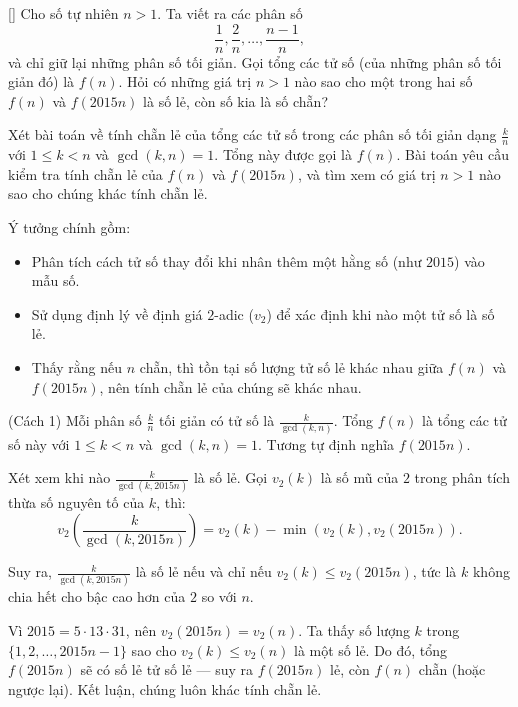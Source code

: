 \documentclass[../06-largest-exponent.tex]{subfiles}
\begin{document}
\begin{example*}\label{example:RUS-2015-MO-11-P2}[\textbf{}]
	Cho số tự nhiên \(n > 1\). Ta viết ra các phân số
	\[
		\frac{1}{n}, \frac{2}{n}, \dots, \frac{n-1}{n},
	\]
	và chỉ giữ lại những phân số tối giản. Gọi tổng các tử số (của những phân số tối giản đó) là \(f(n)\).
	Hỏi có những giá trị \(n > 1\) nào sao cho một trong hai số \(f(n)\) và \(f(2015n)\) là số lẻ, còn số kia là số chẵn?
\end{example*}

\begin{story*}
    Xét bài toán về tính chẵn lẻ của tổng các tử số trong các phân số tối giản dạng \( \frac{k}{n} \) với \( 1 \le k < n \) và \( \gcd(k,n) = 1 \). Tổng này được gọi là \( f(n) \). Bài toán yêu cầu kiểm tra tính chẵn lẻ của \( f(n) \) và \( f(2015n) \), và tìm xem có giá trị \( n > 1 \) nào sao cho chúng khác tính chẵn lẻ.

    Ý tưởng chính gồm:
    \begin{itemize}[topsep=0pt, partopsep=0pt, itemsep=0pt]
        \item Phân tích cách tử số thay đổi khi nhân thêm một hằng số (như \(2015\)) vào mẫu số.
        \item Sử dụng định lý về định giá \(2\)-adic (\(v_2\)) để xác định khi nào một tử số là số lẻ.
        \item Thấy rằng nếu \(n\) chẵn, thì tồn tại số lượng tử số lẻ khác nhau giữa \(f(n)\) và \(f(2015n)\), nên tính chẵn lẻ của chúng sẽ khác nhau.
    \end{itemize}
\end{story*}

\bigbreak

\begin{soln}(Cách 1)\footnotemark
	Mỗi phân số \( \frac{k}{n} \) tối giản có tử số là \( \frac{k}{\gcd(k, n)} \). Tổng \( f(n) \) là tổng các tử số này với \( 1 \le k < n \) và \( \gcd(k, n) = 1 \). Tương tự định nghĩa \( f(2015n) \).

	Xét xem khi nào \( \frac{k}{\gcd(k, 2015n)} \) là số lẻ. Gọi \( v_2(k) \) là số mũ của \(2\) trong phân tích thừa số nguyên tố của \(k\), thì:
	\[
		v_2\left( \frac{k}{\gcd(k, 2015n)} \right) = v_2(k) - \min\left( v_2(k), v_2(2015n) \right).
	\]

	Suy ra, \( \frac{k}{\gcd(k, 2015n)} \) là số lẻ nếu và chỉ nếu \( v_2(k) \le v_2(2015n) \), tức là \(k\) không chia hết cho bậc cao hơn của \(2\) so với \(n\).

	Vì \(2015 = 5 \cdot 13 \cdot 31\), nên \(v_2(2015n) = v_2(n)\). Ta thấy số lượng \(k\) trong \( \{1, 2, \dots, 2015n - 1\} \) sao cho \(v_2(k) \le v_2(n)\) là một số lẻ. Do đó, tổng \(f(2015n)\) sẽ có số lẻ tử số lẻ — suy ra \(f(2015n)\) lẻ, còn \(f(n)\) chẵn (hoặc ngược lại). Kết luận, chúng luôn khác tính chẵn lẻ.
\end{soln}
\end{document}
